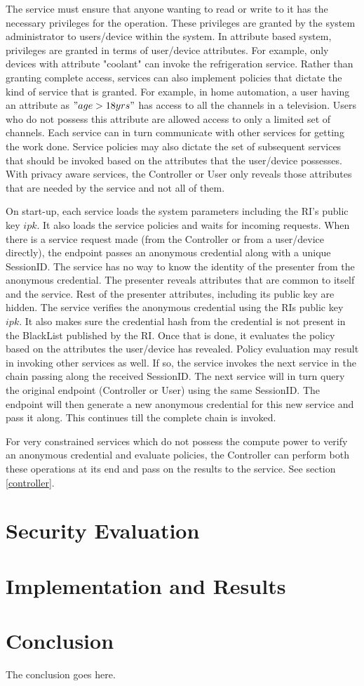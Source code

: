 \documentclass[journal]{IEEEtran}
\begin{document}
The service must ensure that anyone wanting to read or write to it has the necessary privileges for the operation. These privileges are granted by the system administrator to users/device within the system. In attribute based system, privileges are granted in terms of user/device attributes. For example, only devices with attribute "coolant" can invoke the refrigeration service. Rather than granting complete access, services can also implement policies that dictate the kind of service that is granted. For example, in home automation, a user having an attribute as $"age > 18yrs"$ has access to all the channels in a television. Users who do not possess this attribute are allowed access to only a limited set of channels. Each service can in turn communicate with other services for getting the work done. Service policies may also dictate the set of subsequent services that should be invoked based on the attributes that the user/device possesses. With privacy aware services, the Controller or User only reveals those attributes that are needed by the service and not all of them. 

On start-up, each service loads the system parameters including the RI's public key $ipk$. It also loads the service policies and waits for incoming requests. When there is a service request made (from the Controller or from a user/device directly), the endpoint passes an anonymous credential along with a unique SessionID. The service has no way to know the identity of the presenter from the anonymous credential. The presenter reveals  attributes that are common to itself and the service. Rest of the presenter attributes, including its public key are hidden. The service verifies the anonymous credential using the RIs public key $ipk$. It also makes sure the credential hash from the credential is not present in the BlackList published by the RI. Once that is done, it evaluates the policy based on the attributes the user/device has revealed. Policy evaluation may result in invoking other services as well. If so, the service invokes the next service in the chain passing along the received SessionID. The next service will in turn query the original endpoint (Controller or User) using the same SessionID. The endpoint will then generate a new anonymous credential for this new service and pass it along. This continues till the complete chain is invoked.

For very constrained services which do not possess the compute power to verify an anonymous credential and evaluate policies, the Controller can perform both these operations at its end and pass on the results to the service. See section \ref{controller}.

\section{Security Evaluation} \label{seceval}

\section{Implementation and Results} \label{implementation}


\section{Conclusion}
The conclusion goes here.



\end{document}
